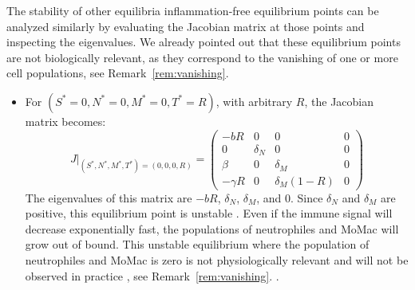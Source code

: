 \documentclass[a4paper, 12pt]{article}
\providecommand{\DIFaddtex}[1]{{\protect\color{blue} \sf #1}} %
\providecommand{\DIFdeltex}[1]{{\protect\color{red} \scriptsize #1}} %
\providecommand{\DIFaddbegin}{} %
\providecommand{\DIFaddend}{} %
\providecommand{\DIFdelbegin}{} %
\providecommand{\DIFdelend}{} %
\providecommand{\DIFadd}[1]{\texorpdfstring{\DIFaddtex{#1}}{#1}} %
\providecommand{\DIFdel}[1]{\texorpdfstring{\DIFdeltex{#1}}{}} %
\begin{document}
The stability of other \DIFdelbegin \DIFdel{equilibria }\DIFdelend \DIFaddbegin \DIFadd{inflammation-free equilibrium }\DIFaddend points can be analyzed similarly by evaluating the Jacobian matrix at those points and inspecting the eigenvalues. 
\DIFaddbegin \DIFadd{We already pointed out that  these equilibrium points are not biologically relevant, as they correspond to the vanishing of one or more cell populations, see Remark~\ref{rem:vanishing}.
}\DIFaddend \begin{itemize}
\item For $(S^* = 0, N^* = 0, M^* = 0, T^* = R)$, with arbitrary $R$, the Jacobian matrix becomes:
\[
J|_{(S^*, N^*, M^*, T^*) = (0, 0, 0, R)} =
\begin{pmatrix}
- b R & 0 & 0 & 0 \\
0 & \delta_N & 0 & 0 \\
\beta & 0 & \delta_M & 0 \\
-\gamma R & 0 & \delta_M (1 - R) & 0
\end{pmatrix}
\]
The eigenvalues of this matrix are $-b R$, $\delta_N$, $\delta_M$, and $0$. Since $\delta_N$ and $\delta_M$ are positive, this equilibrium point is unstable \DIFdelbegin \DIFdel{. Even if the immune signal will decrease exponentially fast, the populations of neutrophiles and MoMac will grow out of bound. This unstable equilibrium where the population of neutrophiles and MoMac is zero is  not physiologically relevant }\DIFdelend and will not be observed in practice\DIFdelbegin \DIFdel{, see Remark~\ref{rem:vanishing}. 
}\DIFdelend \DIFaddbegin \DIFadd{. 
}


\end{itemize}
\end{document}
